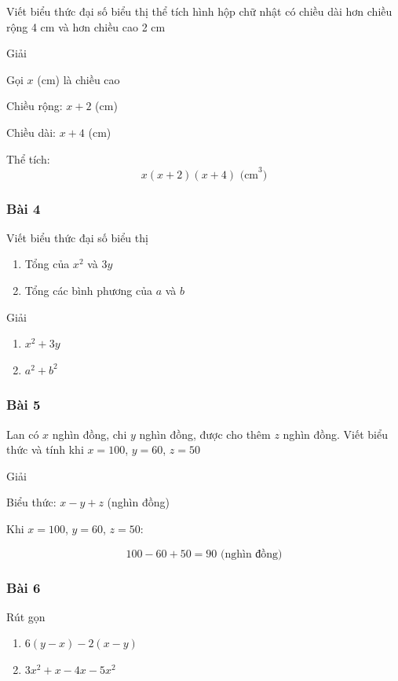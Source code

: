 \documentclass[
]{article}
\providecommand{\tightlist}{%
  \setlength{\itemsep}{0pt}\setlength{\parskip}{0pt}}
\begin{document}
Viết biểu thức đại số biểu thị thể tích hình hộp chữ nhật có chiều dài
hơn chiều rộng 4 cm và hơn chiều cao 2 cm

Giải

Gọi \(x\) (cm) là chiều cao

Chiều rộng: \(x + 2\) (cm)

Chiều dài: \(x + 4\) (cm)

Thể tích: \[x(x + 2)(x + 4) \text{ (cm}^3\text{)}\]

\subsubsection{Bài 4}\label{buxe0i-4}

Viết biểu thức đại số biểu thị

\begin{enumerate}
\def\labelenumi{\alph{enumi})}
\tightlist
\item
  Tổng của \(x^2\) và \(3y\)
\item
  Tổng các bình phương của \(a\) và \(b\)
\end{enumerate}

Giải

\begin{enumerate}
\def\labelenumi{\alph{enumi})}
\tightlist
\item
  \(x^2 + 3y\)
\item
  \(a^2 + b^2\)
\end{enumerate}

\subsubsection{Bài 5}\label{buxe0i-5}

Lan có \(x\) nghìn đồng, chi \(y\) nghìn đồng, được cho thêm \(z\) nghìn
đồng. Viết biểu thức và tính khi \(x = 100\), \(y = 60\), \(z = 50\)

Giải

Biểu thức: \(x - y + z\) (nghìn đồng)

Khi \(x = 100\), \(y = 60\), \(z = 50\):

\[100 - 60 + 50 = 90 \text{ (nghìn đồng)}\]

\subsubsection{Bài 6}\label{buxe0i-6}

Rút gọn

\begin{enumerate}
\def\labelenumi{\alph{enumi})}
\tightlist
\item
  \(6(y - x) - 2(x - y)\)
\item
  \(3x^2 + x - 4x - 5x^2\)
\end{enumerate}
\end{document}
